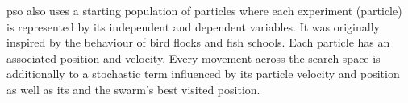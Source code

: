 \iffalse
\Gls{ga} uses a starting population of size $p$ ($p \in$ \td{N$^+$}) where each experiment (or data point) 
is represented by a fixed size genome of 0's and 1's in most cases. 
Each individual is then given a fitness value. 
New genomes are added and discarded from the population using 
selection, mutation and crossover operations.
\fi

\Gls{pso} also uses a starting population of particles where each experiment (particle) 
is represented by its independent and dependent variables. 
It was originally inspired by the behaviour of bird flocks and fish schools\cite{Kennedy1995}.
Each particle has an associated position and velocity. 
Every movement across the search space is 
additionally to a stochastic term
influenced by its particle velocity and position as well as its and the swarm's best visited position.


